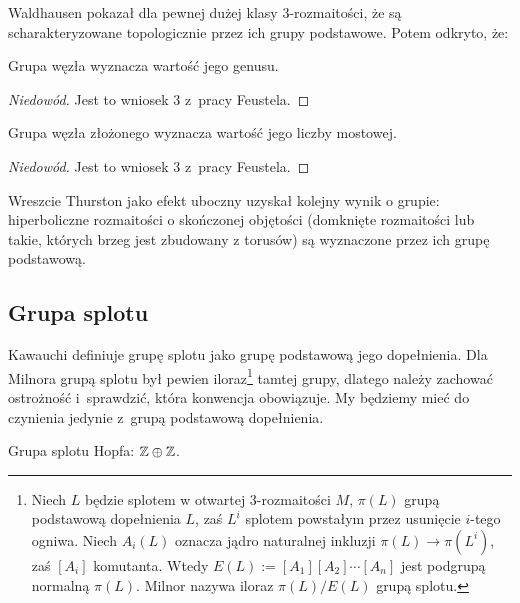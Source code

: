 Waldhausen \cite{waldhausen1968} pokazał dla pewnej dużej klasy 3-rozmaitości, że są scharakteryzowane topologicznie przez ich grupy podstawowe.
%
Potem odkryto, że:

\begin{proposition}
    Grupa węzła wyznacza wartość jego genusu.
\end{proposition}
\begin{proof}[Niedowód]
    Jest to wniosek 3 z~pracy \cite{feustel1978} Feustela.
\end{proof}
\begin{proposition}
    Grupa węzła złożonego wyznacza wartość jego liczby mostowej.
\end{proposition}
\begin{proof}[Niedowód]
    Jest to wniosek 3 z~pracy \cite{feustel1978} Feustela.
\end{proof}

Wreszcie Thurston \cite{thurston1982} jako efekt uboczny uzyskał kolejny wynik o grupie: hiperboliczne rozmaitości o skończonej objętości (domknięte rozmaitości lub takie, których brzeg jest zbudowany z torusów) są wyznaczone przez ich grupę podstawową.
%

\subsection{Grupa splotu}

Kawauchi \cite[s. 73]{kawauchi1996} definiuje grupę splotu jako grupę podstawową jego dopełnienia.
Dla Milnora \cite{milnor54} grupą splotu był pewien iloraz\footnote{%
Niech $L$ będzie splotem w otwartej 3-rozmaitości $M$, $\pi(L)$ grupą podstawową dopełnienia $L$, zaś $L^i$ splotem powstałym przez usunięcie $i$-tego ogniwa.
Niech $A_i(L)$ oznacza jądro naturalnej inkluzji $\pi(L) \to \pi(L^i)$, zaś $[A_i]$ komutanta.
Wtedy $E(L) := [A_1][A_2] \cdots [A_n]$ jest podgrupą normalną $\pi(L)$.
Milnor nazywa iloraz $\pi(L) / E(L)$ grupą splotu.%
} tamtej grupy, dlatego należy zachować ostrożność i~sprawdzić, która konwencja obowiązuje.
My będziemy mieć do czynienia jedynie z~grupą podstawową dopełnienia.

\begin{example}
    Grupa splotu Hopfa: $\mathbb Z \oplus \mathbb Z$.
\end{example}

